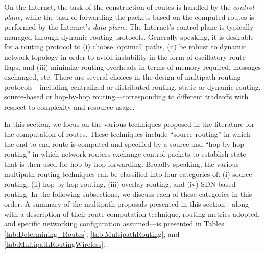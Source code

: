 \documentclass[10pt]{IEEEtran}
\begin{document}
On the Internet, the task of the construction of routes is handled by the \textit{control plane}, while the task of forwarding the packets based on the computed routes is performed by the Internet's \textit{data plane}. The Internet's control plane is typically managed through dynamic routing protocols. Generally speaking, it is desirable for a routing protocol to (i) choose `optimal' paths, (ii) be robust to dynamic network topology in order to avoid instability in the form of oscillatory route flaps, and (iii) minimize routing overheads in terms of memory required, messages exchanged, etc. There are several choices in the design of multipath routing protocols---including centralized or distributed routing, static or dynamic routing, source-based or hop-by-hop routing---corresponding to different tradeoffs with respect to complexity and resource usage. 

In this section, we focus on the various techniques proposed in the literature for the computation of routes. These techniques include ``source routing'' in which the end-to-end route is computed and specified by a source and ``hop-by-hop routing'' in which network routers exchange control packets to establish state that is then used for hop-by-hop forwarding. Broadly speaking, the various multipath routing techniques can be classified into four categories of: (i) source routing, (ii) hop-by-hop routing, (iii) overlay routing, and (iv) SDN-based routing. In the following subsections, we discuss each of these categories in this order. A summary of the multipath proposals presented in this section---along with a description of their route computation technique, routing metrics adopted, and specific networking configuration assumed---is presented in Tables \ref{tab:Determining_Routes}, \ref{tab:MultipathRouting}, and \ref{tab:MultipathRoutingWireless}.
\end{document}
